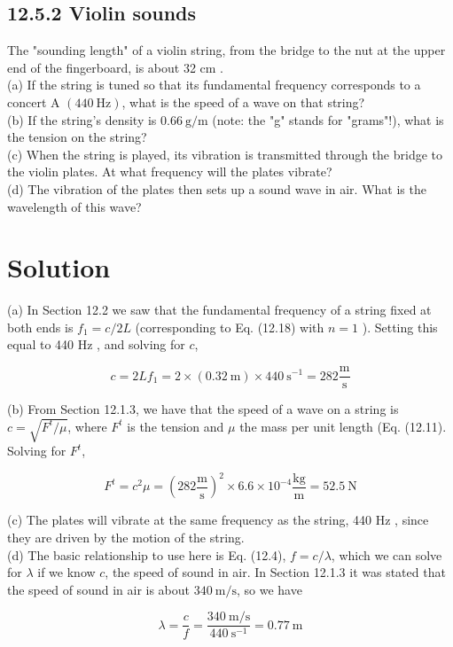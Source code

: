 \documentclass[10pt]{article}
\begin{document}
\subsection*{12.5.2 Violin sounds}
The "sounding length" of a violin string, from the bridge to the nut at the upper end of the fingerboard, is about 32 cm .\\
(a) If the string is tuned so that its fundamental frequency corresponds to a concert A $(440 \mathrm{~Hz})$, what is the speed of a wave on that string?\\
(b) If the string's density is $0.66 \mathrm{~g} / \mathrm{m}$ (note: the "g" stands for "grams"!), what is the tension on the string?\\
(c) When the string is played, its vibration is transmitted through the bridge to the violin plates. At what frequency will the plates vibrate?\\
(d) The vibration of the plates then sets up a sound wave in air. What is the wavelength of this wave?

\section*{Solution}
(a) In Section 12.2 we saw that the fundamental frequency of a string fixed at both ends is $f_{1}=c / 2 L$ (corresponding to Eq. (12.18) with $n=1$ ). Setting this equal to 440 Hz , and solving for $c$,

$$
c=2 L f_{1}=2 \times(0.32 \mathrm{~m}) \times 440 \mathrm{~s}^{-1}=282 \frac{\mathrm{m}}{\mathrm{s}}
$$

(b) From Section 12.1.3, we have that the speed of a wave on a string is $c=\sqrt{F^{t} / \mu}$, where $F^{t}$ is the tension and $\mu$ the mass per unit length (Eq. (12.11). Solving for $F^{t}$,

$$
F^{t}=c^{2} \mu=\left(282 \frac{\mathrm{m}}{\mathrm{s}}\right)^{2} \times 6.6 \times 10^{-4} \frac{\mathrm{kg}}{\mathrm{m}}=52.5 \mathrm{~N}
$$

(c) The plates will vibrate at the same frequency as the string, 440 Hz , since they are driven by the motion of the string.\\
(d) The basic relationship to use here is Eq. (12.4), $f=c / \lambda$, which we can solve for $\lambda$ if we know $c$, the speed of sound in air. In Section 12.1.3 it was stated that the speed of sound in air is about $340 \mathrm{~m} / \mathrm{s}$, so we have

$$
\lambda=\frac{c}{f}=\frac{340 \mathrm{~m} / \mathrm{s}}{440 \mathrm{~s}^{-1}}=0.77 \mathrm{~m}
$$
\end{document}
